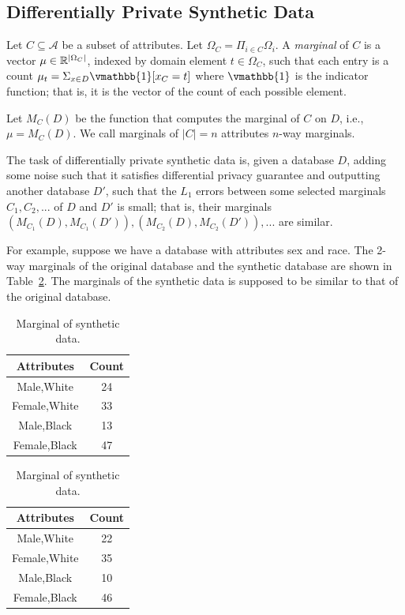 \documentclass[acmsmall,sigconf]{acmart}
\DeclarePairedDelimiter{\abs}{\lvert}{\rvert}
\newcommand{\db}{D}
\begin{document}
\subsection{Differentially Private Synthetic Data}

Let $C \subseteq \mathcal{A}$ be a subset of attributes. Let $\Omega_C = \Pi_{i \in C} \Omega_i$. A \emph{marginal}\cite{barak2007privacy,mckenna2021winning} of $C$ is a vector $\mu \in \mathbb{R}^{\abs{\Omega_C}}$, indexed by domain element $t \in \Omega_C$, such that each entry is a count $\mu_t = \Sigma_{x \in \db} \vmathbb{1} [x_C = t]$ where $\vmathbb{1}$ is the indicator function; that is, it is the vector of the count of each possible element.

Let $M_C(\db)$ be the function that computes the marginal of $C$ on $\db$, i.e., $\mu = M_C(\db)$. We call marginals of $|C| = n$ attributes $n$-way marginals.

The task of differentially private synthetic data\cite{NIST_Differentially_Private_Synthetic_Data,YouTube_Differentially_Private_Synthetic_Data} is, given a database $\db$, adding some noise such that it satisfies differential privacy guarantee and outputting another database $\db'$, such that the $L_1$ errors between some selected marginals $C_1,C_2,...$ of $\db$ and $\db'$ is small; that is, their marginals $(M_{C_1}(\db),M_{C_1}(\db')),(M_{C_2}(\db),M_{C_2}(\db')),...$ are similar.

For example, suppose we have a database with attributes sex and race. The 2-way marginals of the original database and the synthetic database are shown in Table~\ref{tab:marginal-example}. The marginals of the synthetic data is supposed to be similar to that of the original database.

\begin{table}[h]
\caption{Example marginals.}
\label{tab:marginal-example}
\centering
\begin{subtable}[t]{0.45\linewidth}
\centering
\caption{Marginal of original data.}
\begin{tabular}{cc}
\toprule
Attributes & Count \\
\midrule
Male,White & 24 \\
Female,White & 33 \\
Male,Black & 13 \\
Female,Black & 47 \\
\bottomrule
\end{tabular}
\end{subtable}
\hspace{0.05\linewidth}
\begin{subtable}[t]{0.45\linewidth}
\centering
\caption{Marginal of synthetic data.}
\begin{tabular}{cc}
\toprule
Attributes & Count \\
\midrule
Male,White & 22 \\
Female,White & 35 \\
Male,Black & 10 \\
Female,Black & 46 \\
\bottomrule
\end{tabular}
\end{subtable}
\end{table}
\end{document}
